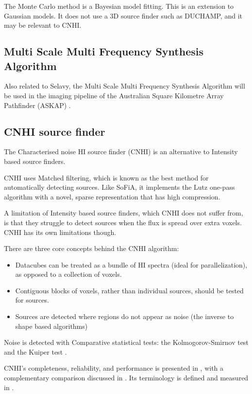 \documentclass[prodmode,acmtecs]{acmsmall} %
\begin{document}
The Monte Carlo method \cite{allison2011application} is a Bayesian model fitting.
This is an extension to Gaussian models. It does not use a 3D source finder
such as DUCHAMP, and it may be relevant to CNHI.

\subsection{Multi Scale Multi Frequency Synthesis Algorithm}

Also related to Selavy, the Multi Scale Multi Frequency Synthesis Algorithm will be used in
the imaging pipeline of the Australian Square Kilometre Array Pathfinder (ASKAP) \cite{rau2009advances}.

\subsection{CNHI source finder}

The Characterised noise HI source finder (CNHI) \cite{jurek2012characterised} 
is an alternative to Intensity based source finders.

CNHI uses Matched filtering, which is known as the best method for automatically detecting sources.
Like SoFiA, it implements the Lutz one-pass algorithm with a novel, 
sparse representation that has high compression.

A limitation of Intensity based source finders, which CNHI does not suffer from,
is that they struggle to detect sources when the flux is spread over extra voxels.
CNHI has its own limitations though.

There are three core concepts behind the CNHI algorithm:

\begin{itemize}
\item Datacubes can be treated as a bundle of HI spectra (ideal for parallelization), as opposed to a collection of voxels.
\item Contiguous blocks of voxels, rather than individual sources, should be tested for sources.
\item Sources are detected where regions do not appear as noise (the inverse to shape based algorithms)
\end{itemize}

Noise is detected with Comparative statistical tests:
the Kolmogorov-Smirnov test \cite{kendall1979advanced} and the Kuiper test \cite{kuiper1960tests}.

CNHI's completeness, reliability, and performance is presented in 
\cite{popping2012comparison}, with a complementary comparison discussed in \cite{westmeier2012basic}. 
Its terminology is defined and measured in \cite{popping2012comparison}.
\end{document}
